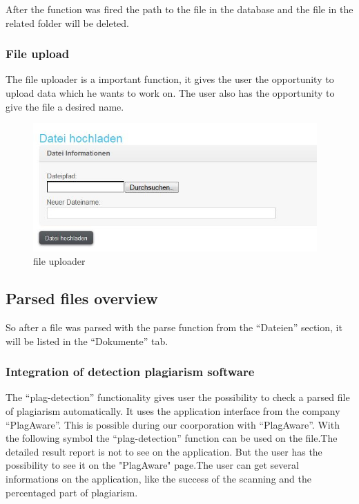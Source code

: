 After the function was fired the path to the file in the database and the file in the related folder will be deleted.

\subsubsection{File upload}

The file uploader is a important function, it gives the user the opportunity to upload data which he wants to work on. The user also has the opportunity to give the file a desired name.

\begin{figure}[!ht]
  \centering
    \includegraphics[width=0.97\textwidth]{images/basic_functionalities/datei_hochladen.jpg}
  \caption{file uploader}
  \label{fig:file uploader}
\end{figure}

\subsection{Parsed files overview}\label{sec:parse-file}

So after a file was parsed with the parse function from the \enquote{Dateien} section, it will be listed in the 
\enquote{Dokumente} tab.

\subsubsection{Integration of detection plagiarism software}

The \enquote{plag-detection} functionality gives user the possibility to check a parsed file of plagiarism automatically. 
It uses the application interface from the company \enquote{PlagAware}. This is possible during our coorporation with 
\enquote{PlagAware}.
With the following symbol the \enquote{plag-detection} function can be used on the file.The detailed result report is 
not to see on the application. But the user has the possibility to see it on the "PlagAware" page.The user can get 
several informations on the application, like the success of the scanning and the percentaged part of plagiarism.

